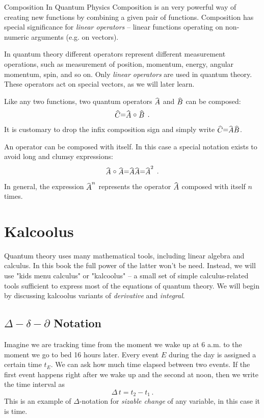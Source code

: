 \begin{mybio}{Composition In Quantum Physics}
	Composition is an very powerful way of creating new functions by combining a given pair of functions. Composition has special significance for \emph{linear operators} -- linear functions operating on non-numeric arguments (e.g. on vectors). 
	
	In quantum theory different operators represent different measurement operations, such as  measurement of position, momentum, energy, angular momentum, spin, and so on. Only \emph{linear operators} are used in quantum theory. These operators act on special vectors, as we will later learn.
	
	Like any two functions, two quantum operators $\op{A}$ and $\op{B}$ can be composed:
	\[
	\op{C} = \op{A}\circ\op{B}\,.
	\]
	It is customary to drop the infix composition sign and simply write $\op{C} = \op{A}\op{B}$.
	
	An operator can be composed with itself. In this case a special notation exists to avoid long and clumsy expressions:
	\[
		\op{A}\circ\op{A}=\op{A}\op{A}=\op{A}^2\,.
	\]
	In general, the expression $\op{A}^n$ represents the operator $\op{A}$ composed with itself $n$ times.
	
\end{mybio}

\section{Kalcoolus}
Quantum theory uses many mathematical tools, including linear algebra and calculus. In this book the full power of the latter won't be need. Instead, we will use "kids menu calculus" or "kalcoolus" -- a small set of simple calculus-related tools sufficient to express most of the equations of quantum theory. We will begin by discussing kalcoolus variants of \emph{derivative} and \emph{integral}.

\subsection{$\Delta-\delta-\partial$ Notation}
Imagine we are tracking time from the moment we wake up at 6 a.m. to the moment we go to bed 16 hours later. Every event $E$ during the day is assigned a certain time $t_E$. We can ask how much time elapsed between two events. If the first event happens right after we wake up and the second at noon, then we write the time interval as
\[
\Delta\, t = t_2 - t_1\,.
\]
This is an example of $\Delta$-notation for \emph{sizable change} of any variable, in this case it is time.

